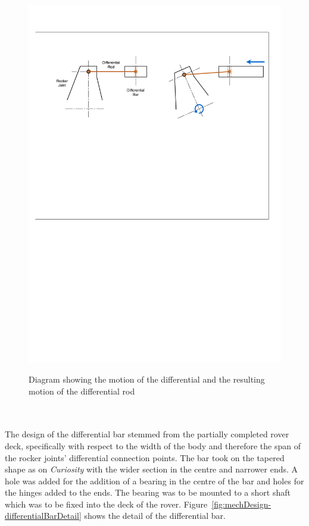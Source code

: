 \begin{figure}[h!]
{        \includegraphics[clip, trim=2cm 26cm 2cm 4cm, width=0.9\linewidth]{figures/mechDesign-differentialMotionSide.pdf}
      }
      \caption[Diagram showing the motion of the differential and the resulting motion of the differential rod]{Diagram showing the motion of the differential and the resulting motion of the differential rod}
      \label{fig:mechDesign-differentialMotion}
      \end{figure}
      
      
      \\\\
        The design of the differential bar stemmed from the partially completed rover deck, specifically with respect to the width of the body and therefore the span of the rocker joints' differential connection points. The bar took on the tapered shape as on \textit{Curiosity} with the wider section in the centre and narrower ends. A hole was added for the addition of a bearing in the centre of the bar and holes for the hinges added to the ends. The bearing was to be mounted to a short shaft which was to be fixed into the deck of the rover. Figure~\ref{fig:mechDesign-differentialBarDetail} shows the detail of the differential bar.
        
